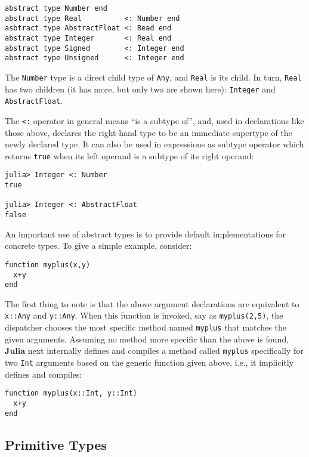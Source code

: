 \documentclass[
]{article}
\begin{document}
\begin{verbatim}
abstract type Number end
abstract type Real          <: Number end
asbtract type AbstractFloat <: Read end
abstract type Integer       <: Real end
abstract type Signed        <: Integer end
abstract type Unsigned      <: Integer end
\end{verbatim}

The \texttt{Number} type is a direct child type of \texttt{Any}, and
\texttt{Real} is its child. In turn, \texttt{Real} has two children (it
has more, but only two are shown here): \texttt{Integer} and
\texttt{AbstractFloat}.

The \texttt{\textless{}:} operator in general means ``is a subtype of'',
and, used in declarations like those above, declares the right-hand type
to be an immediate supertype of the newly declared type. It can also be
used in expressions as subtype operator which returns \texttt{true} when
its left operand is a subtype of its right operand:

\begin{verbatim}
julia> Integer <: Number
true

julia> Integer <: AbstractFloat
false
\end{verbatim}

An important use of abstract types is to provide default implementations
for concrete types. To give a simple example, consider:

\begin{verbatim}
function myplus(x,y)
  x+y
end
\end{verbatim}

The first thing to note is that the above argument declarations are
equivalent to \texttt{x::Any} and \texttt{y::Any}. When this function is
invoked, say as \texttt{myplus(2,5)}, the dispatcher chooses the most
specific method named \texttt{myplus} that matches the given arguments.
Assuming no method more specific than the above is found, \textbf{Julia}
next internally defines and compiles a method called \texttt{myplus}
specifically for two \texttt{Int} arguments based on the generic
function given above, i.e., it implicitly defines and compiles:

\begin{verbatim}
function myplus(x::Int, y::Int)
  x+y
end
\end{verbatim}

\hypertarget{primitive-types}{%
\subsection{Primitive Types}\label{primitive-types}}
\end{document}
